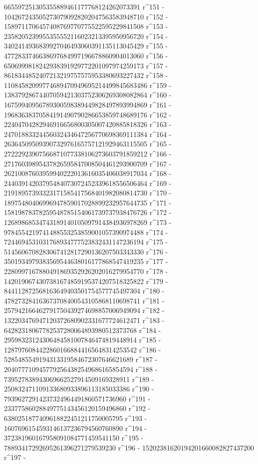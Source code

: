        665597251305355889461177768124262073391 r^151 - 
       1042672435052730790928202047563583948710 r^152 - 
       1589711706457408769770775522595229841508 r^153 - 
       2358205239955355552116023213395950956720 r^154 - 
       3402414936839927046493060391135113045429 r^155 - 
       4772833746638697684997196678860904013060 r^156 - 
       6506999818242938391929772201097974259173 r^157 - 
       8618344852407213219757575953380693227432 r^158 - 
       11084582099774689470949695214499845683486 r^159 - 
       13837928674407059421303752306269308082864 r^160 - 
       16759940956789300598389449828497893994869 r^161 - 
       19683638370584191490790286653859748689176 r^162 - 
       22404704282946916656800305007420885818326 r^163 - 
       24701883324456032434647256770698369111384 r^164 - 
       26364509509390732976165757121929463115505 r^165 - 
       27222923907566871077338106273603791859212 r^166 - 
       27176039895437826595847008504461293900709 r^167 - 
       26210087603959940222013616035406038917034 r^168 - 
       24403914203795484073072452339618556506464 r^169 - 
       21918957393323171585417568401982080814730 r^170 - 
       18975480406996947859017028899232957644735 r^171 - 
       15819878378259548785154061739737938476726 r^172 - 
       12689868534743189140105097914384936978269 r^173 - 
       9784554219741488553253859001057390974488 r^174 - 
       7244694531031768934777523832431147236194 r^175 - 
       5145606708283067412817290136207503343330 r^176 - 
       3501934979383569544638016177868547419235 r^177 - 
       2280997167880491869352926202016279954770 r^178 - 
       1420190674307381674859195374207518325822 r^179 - 
       844112872568163649403501754577745497304 r^180 - 
       478273284163673708400543105868110698741 r^181 - 
       257942166462791750439274698857006949094 r^182 - 
       132203476947120372680902331677724612471 r^183 - 
       64282318067782537280064893980512373768 r^184 - 
       29598323124306484581007846474819448914 r^185 - 
       12879760844228601668844165648314253542 r^186 - 
       5285485549194313319584672307646621689 r^187 - 
       2040777109457792564382549686165854594 r^188 - 
       739527838943069662527914509169328911 r^189 - 
       250832471109133680933896113185033386 r^190 - 
       79396272914237324964491860571736960 r^191 - 
       23377586028849775143456120159496860 r^192 - 
       6380251877409618822451211750005795 r^193 - 
       1607696154593146137236794560760890 r^194 - 
       372381960167958091084771459541150 r^195 - 
       78893417292695261396271279539230 r^196 - 
       15202381620194201660082827437200 r^197 - 
